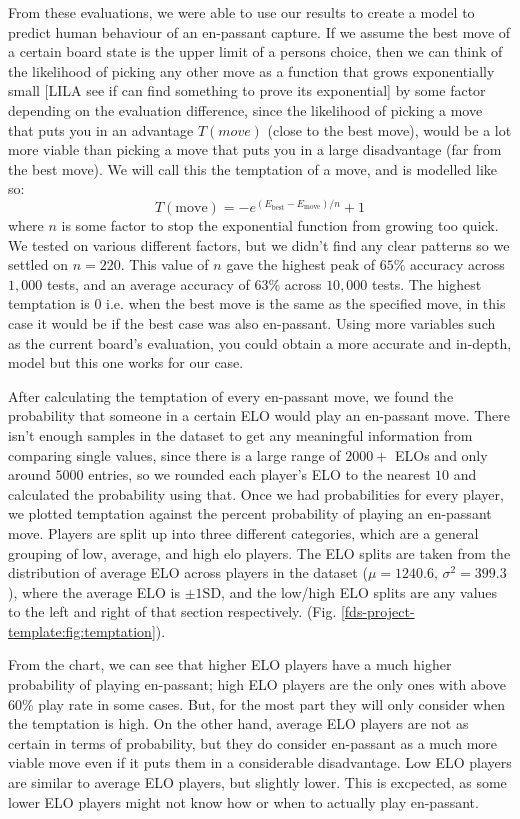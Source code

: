 \documentclass[10pt,a4paper,twocolumn]{article}
\begin{document}
From these evaluations, we were able to use our results to create a model to predict human behaviour of an en-passant capture. If we assume the best move of a certain board state is the upper limit of a persons choice, then we can think of the likelihood of picking any other move as a function that grows exponentially small [LILA see if can find something to prove its exponential] by some factor depending on the evaluation difference, since the likelihood of picking a move that puts you in an advantage $T(move)$ (close to the best move), would be a lot more viable than picking a move that puts you in a large disadvantage (far from the best move). We will call this the temptation of a move, and is modelled like so:
$$T(\text{move})= -e^{(E_{\text{best}} - E_{\text{move}})/{n}} + 1$$
where $n$ is some factor to stop the exponential function from growing too quick. We tested on various different factors, but we didn't find any clear patterns so we settled on $n=220$. This value of $n$ gave the highest peak of $65\%$ accuracy across $1,000$ tests, and an average accuracy of $63\%$ across $10,000$ tests. The highest temptation is $0$ i.e. when the best move is the same as the specified move, in this case it would be if the best case was also en-passant. Using more variables such as the current board's evaluation, you could obtain a more accurate and in-depth, model but this one works for our case. \newline

After calculating the temptation of every en-passant move, we found the probability that someone in a certain ELO would play an en-passant move. There isn't enough samples in the dataset to get any meaningful information from comparing single values, since there is a large range of $2000+$ ELOs and only around $5000$ entries, so we rounded each player's ELO to the nearest $10$ and calculated the probability using that. Once we had probabilities for every player, we plotted temptation against the percent probability of playing an en-passant move. Players are split up into three different categories, which are a general grouping of low, average, and high elo players. The ELO splits are taken from the distribution of average ELO across players in the dataset ($\mu=1240.6,\,\sigma^{2}=399.3$), where the average ELO is $\pm 1\text{SD}$, and the low/high ELO splits are any values to the left and right of that section respectively. (Fig. \ref{fds-project-template:fig:temptation}).\newline

From the chart, we can see that higher ELO players have a much higher probability of playing en-passant; high ELO players are the only ones with above 60\% play rate in some cases.  But, for the most part they will only consider when the temptation is high. On the other hand, average ELO players are not as certain in terms of probability, but they do consider en-passant as a much more viable move even if it puts them in a considerable disadvantage. Low ELO players are similar to average ELO players, but slightly lower. This is excpected, as some lower ELO players might not know how or when to actually play en-passant. \newline
\end{document}
